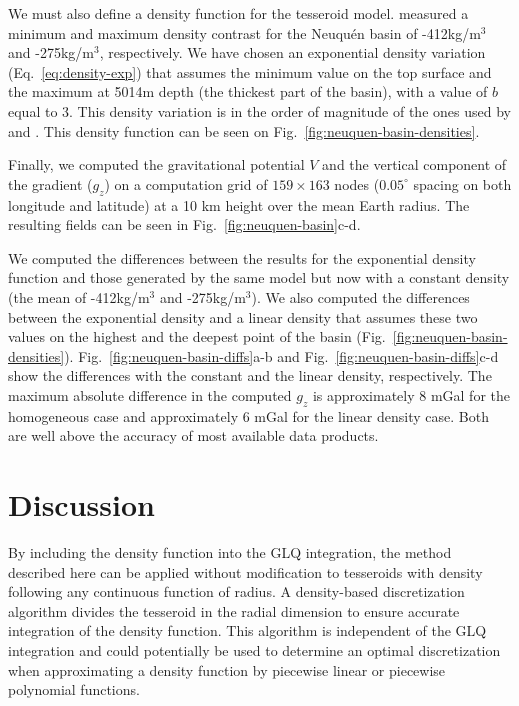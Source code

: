 We must also define a density function for the tesseroid model.
\citet{sigismondi2012} measured a minimum and maximum density contrast for
the Neuquén basin of -412kg/m$^3$ and -275kg/m$^3$, respectively.
We have chosen an exponential density variation (Eq.~\ref{eq:density-exp}) that assumes
the minimum value on the top surface and the maximum at 5014m depth (the thickest part
of the basin), with a value of $b$ equal to 3.
This density variation is in the order of magnitude of the ones used by
\citet{cowie1990} and \citet{cordell1973}.
This density function can be seen on Fig.~\ref{fig:neuquen-basin-densities}.

Finally, we computed the gravitational potential $V$ and the vertical component of the
gradient ($g_z$) on a computation grid of $159\times163$ nodes ($0.05^\circ$ spacing on
both longitude and latitude) at a 10 km height over the mean Earth radius.
The resulting fields can be seen in Fig.~\ref{fig:neuquen-basin}c-d.

We computed the differences between the results for the exponential density function and
those generated by the same model but now with a constant density (the mean of
-412kg/m$^3$ and -275kg/m$^3$).
We also computed the differences between the exponential density and a linear density
that assumes these two values on the highest and the deepest point of the basin
(Fig.~\ref{fig:neuquen-basin-densities}).
Fig.~\ref{fig:neuquen-basin-diffs}a-b and Fig.~\ref{fig:neuquen-basin-diffs}c-d show the
differences with the constant and the linear density, respectively.
The maximum absolute difference in the computed $g_z$ is approximately 8 mGal for the
homogeneous case and approximately 6 mGal for the linear density case.
Both are well above the accuracy of most available data products.



\section{Discussion}

By including the density function into the GLQ integration, the method described here
can be applied without modification to tesseroids with density following any continuous
function of radius.
A density-based discretization algorithm divides the tesseroid in the radial dimension
to ensure accurate integration of the density function.
This algorithm is independent of the GLQ integration and could potentially be used to
determine an optimal discretization when approximating a density function by piecewise
linear \citep{lin2019} or piecewise polynomial \citep{fukushima2018} functions.

